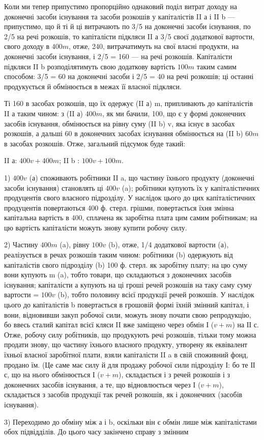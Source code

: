 Коли ми тепер припустимо пропорційно однаковий поділ витрат
доходу на доконечні засоби існування та засоби розкошів у капіталістів
II а і II b — припустимо, що й ті й ці витрачають по 3/5 на доконечні
засоби існування, по 2/5 на речі розкошів, то капіталісти підкляси II а
3/5 своєї додаткової вартости, свого доходу в $400 m$, отже, 240, витрачатимуть
на свої власні продукти, на доконечні засоби існування, і
2/5 = 160 — на речі розкошів. Капіталісти підкляси II b розподілятимуть
свою додаткову вартість $100 m$ таким самим способом: 3/5 = 60 на доконечні
засоби і 2/5 = 40 на речі розкошів; ці останні продукується й
обмінюється в межах її власної підкляси.

Ті 160 в засобах розкошів, що їх одержує (II а) m, припливають до
капіталістів II а таким чином: з (II а) $400 m$, як ми бачили, 100, що є у
формі доконечних засобів існування, обмінюється на рівну суму (II b) v,
яка існує в засобах розкошів, а дальші 60 в доконечних засобах існування
обмінюється на (II b) $60 m$ в засобах розкошів. Отже, загальний
підсумок буде такий:

II а: $400 v + 400 m$; II b : $100 v + 100 m$.

1) $400 v$ (а) споживають робітники II a, що частину їхнього продукту
(доконечні засоби існування) становлять ці $400 v$ (a); робітники купують
їх у капіталістичних продуцентів свого власного підрозділу. У наслідок
цього до цих капіталістичних продуцентів повертаються 400 ф. стерл.
грішми, повертається їхня змінна капітальна вартість в 400, сплачена як
заробітна плата цим самим робітникам; на цю вартість капіталісти можуть
знову купити робочу силу.

2) Частину $400 m$ (a), рівну $100 v$ (b), отже, 1/4 додаткової вартости (а),
реалізується в речах розкошів таким чином: робітники (b) одержують від
капіталістів свого підрозділу (b) 100 ф. стерл. як заробітну плату; на
цю суму вони купують m (a), тобто товари, що складаються з доконечних
засобів існування; капіталісти а купують на ці гроші речей
розкошів на таку саму суму вартости = $100 v$ (b), тобто половину всієї
продукції речей розкошів. У наслідок цього до капіталістів b повертається
в грошовій формі їхній змінний капітал, і вони, відновивши закуп
робочої сили, можуть знову почати свою репродукцію, бо ввесь сталий
капітал всієї кляси II вже заміщено через обмін І ($v + m$) на ІІ с. Отже,
робочу силу робітників, що продукують речі розкошів, тільки тому
можна продати знову, що частину їхнього власного продукту, утворену
як еквівалент їхньої власної заробітної плати, взяли капіталісти II a в
свій споживний фонд, продано їм. (Це саме має силу й для продажу робочої
сили підрозділу І: бо те ІІ с, що на нього обмінюється І ($v + m$), складається
і з речей розкошів і з доконечних засобів існування, а те, що
відновлюється через І ($v + m$), складається з засобів продукції так речей
розкошів, як і доконечних (засобів існування).

3) Переходимо до обміну між а і b, оскільки він є обмін лише між
капіталістами обох підвідділів. До цього часу закінчено справу з змінним
\parbreak{}  %
